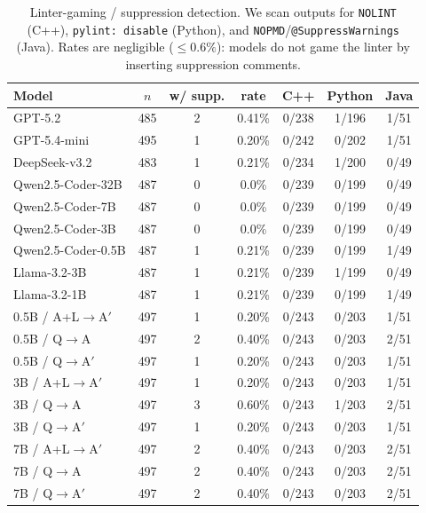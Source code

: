 \begin{table}[t]
\centering
\small
\begin{tabular}{lcccccc}
\toprule
\textbf{Model} & $n$ & w/ supp. & rate & C++ & Python & Java\\
\midrule
GPT-5.2 & 485 & 2 & 0.41\% & 0/238 & 1/196 & 1/51 \\
GPT-5.4-mini & 495 & 1 & 0.20\% & 0/242 & 0/202 & 1/51 \\
DeepSeek-v3.2 & 483 & 1 & 0.21\% & 0/234 & 1/200 & 0/49 \\
Qwen2.5-Coder-32B & 487 & 0 & 0.0\% & 0/239 & 0/199 & 0/49 \\
Qwen2.5-Coder-7B & 487 & 0 & 0.0\% & 0/239 & 0/199 & 0/49 \\
Qwen2.5-Coder-3B & 487 & 0 & 0.0\% & 0/239 & 0/199 & 0/49 \\
Qwen2.5-Coder-0.5B & 487 & 1 & 0.21\% & 0/239 & 0/199 & 1/49 \\
Llama-3.2-3B & 487 & 1 & 0.21\% & 0/239 & 1/199 & 0/49 \\
Llama-3.2-1B & 487 & 1 & 0.21\% & 0/239 & 0/199 & 1/49 \\
0.5B / A+L$\rightarrow$A$'$ & 497 & 1 & 0.20\% & 0/243 & 0/203 & 1/51 \\
0.5B / Q$\rightarrow$A & 497 & 2 & 0.40\% & 0/243 & 0/203 & 2/51 \\
0.5B / Q$\rightarrow$A$'$ & 497 & 1 & 0.20\% & 0/243 & 0/203 & 1/51 \\
3B / A+L$\rightarrow$A$'$ & 497 & 1 & 0.20\% & 0/243 & 0/203 & 1/51 \\
3B / Q$\rightarrow$A & 497 & 3 & 0.60\% & 0/243 & 1/203 & 2/51 \\
3B / Q$\rightarrow$A$'$ & 497 & 1 & 0.20\% & 0/243 & 0/203 & 1/51 \\
7B / A+L$\rightarrow$A$'$ & 497 & 2 & 0.40\% & 0/243 & 0/203 & 2/51 \\
7B / Q$\rightarrow$A & 497 & 2 & 0.40\% & 0/243 & 0/203 & 2/51 \\
7B / Q$\rightarrow$A$'$ & 497 & 2 & 0.40\% & 0/243 & 0/203 & 2/51 \\
\bottomrule
\end{tabular}
\caption{Linter-gaming / suppression detection. We scan outputs for \texttt{NOLINT} (C++), \texttt{pylint: disable} (Python), and \texttt{NOPMD}/\texttt{@SuppressWarnings} (Java). Rates are negligible ($\le0.6\%$): models do not game the linter by inserting suppression comments.}
\label{tab:suppression_detection}
\end{table}